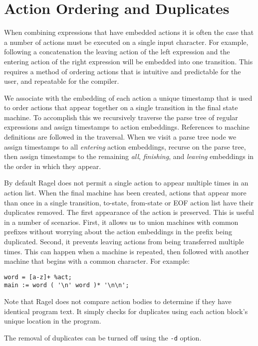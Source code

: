 \documentclass[letterpaper,11pt,oneside]{book}
\newcommand{\verbspace}{\vspace{10pt}}
\begin{document}
\section{Action Ordering and Duplicates}

When combining expressions that have embedded actions it is often the case that
a number of actions must be executed on a single input character. For example,
following a concatenation the leaving action of the left expression and the
entering action of the right expression will be embedded into one transition.
This requires a method of ordering actions that is intuitive and
predictable for the user, and repeatable for the compiler. 

We associate with the embedding of each action a unique timestamp that is
used to order actions that appear together on a single transition in the final
state machine. To accomplish this we recursively traverse the parse tree of
regular expressions and assign timestamps to action embeddings. References to
machine definitions are followed in the traversal. When we visit a
parse tree node we assign timestamps to all {\em entering} action embeddings,
recurse on the parse tree, then assign timestamps to the remaining {\em all},
{\em finishing}, and {\em leaving} embeddings in the order in which they
appear.

By default Ragel does not permit a single action to appear multiple times in an action
list. When the final machine has been created, actions that appear more than
once in a single transition, to-state, from-state or EOF action list have their
duplicates removed.
The first appearance of the action is preserved. This is useful in a number of
scenarios. First, it allows us to union machines with common prefixes without
worrying about the action embeddings in the prefix being duplicated. Second, it
prevents leaving actions from being transferred multiple times. This can
happen when a machine is repeated, then followed with another machine that
begins with a common character. For example:

\verbspace
\begin{verbatim}
word = [a-z]+ %act;
main := word ( '\n' word )* '\n\n';
\end{verbatim}
\verbspace

Note that Ragel does not compare action bodies to determine if they have
identical program text. It simply checks for duplicates using each action
block's unique location in the program.

The removal of duplicates can be turned off using the \verb|-d| option.
\end{document}
